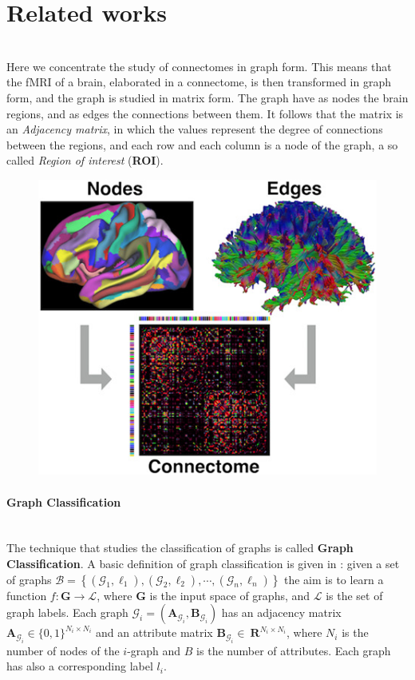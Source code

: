 \section{Related works}\
\\
Here we concentrate the study of connectomes in graph form. This means that the fMRI of a brain, elaborated in a connectome, is then transformed in graph form, and the graph is studied in matrix form. The graph have as nodes the brain regions, and as edges the connections between them. It follows that the matrix is an \emph{Adjacency matrix}, in which the values represent the degree of connections between the regions, and each row and each column is a node of the graph, a so called \emph{Region of interest} (\textbf{ROI}).
\begin{figure}[htbp]
	\centering
	\includegraphics[scale=0.8]{Immagini/nbm3752-toc-0001-m.jpg}
	\caption{\label{fig:diagram4}}
\end{figure}

\paragraph{Graph Classification}\
\\
The technique that studies the classification of graphs is called \textbf{Graph Classification}. A basic definition of graph classification is given in \cite{10.1145/3219819.3219980}: given a set of graphs $\mathcal{B}=\left\{\left(\mathcal{G}_{1}, \ell_{1}\right),\left(\mathcal{G}_{2}, \ell_{2}\right), \cdots,\left(\mathcal{G}_{n}, \ell_{n}\right)\right\}$ the aim is to learn a function $f: \mathbf{G} \rightarrow \mathcal{L}$, where $\mathbf{G}$ is the input space of graphs, and $\mathcal{L}$ is the set of graph labels. Each graph $\mathcal{G}_{i}=\left(\mathbf{A}_{\mathcal{G}_{i}}, \mathbf{B}_{\mathcal{G}_{i}}\right)$ has an adjacency matrix $\mathbf{A}_{\mathcal{G}_{i}} \in\{0,1\}^{N_{i} \times N_{i}}$ and an attribute matrix $\mathbf{B}_{\mathcal{G}_{i}} \in\ \mathbf{R}^{N_{i} \times N_{i}}$, where ${N}_{i}$ is the number of nodes of the $i$-graph and $B$ is the number of attributes. Each graph has also a corresponding label $l_{i}$. 	

